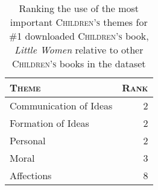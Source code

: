 % 
\begin{table}[h]
    \caption{Ranking the use of the most important \textsc{Children's} themes for \#1 downloaded \textsc{Children's} book, \textit{Little Women} relative to other \textsc{Children's} books in the dataset}
    \label{tab:little women}
    \begin{tabular}{l|r}
        \hline
        \centering
        \textsc{Theme} & \textsc{Rank} \\
        \hline
        Communication of Ideas & 2 \\
        Formation of Ideas & 2 \\
        Personal & 2 \\
        Moral & 3 \\
        Affections & 8 \\
        \hline
    \end{tabular}
\end{table}
